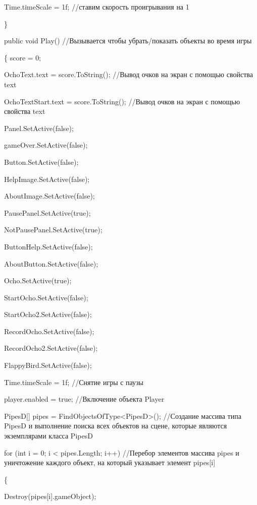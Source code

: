 \documentclass[14pt, oneside]{altsu-report}
\begin{document}
        Time.timeScale = 1f; //ставим скорость проигрывания на 1 
        
    \}
    

    public void Play() //Вызывается чтобы убрать/показать объекты во время игры 
    
    \{
        score = 0;

        OchoText.text = score.ToString(); //Вывод очков на экран с помощью свойства text

        OchoTextStart.text = score.ToString(); //Вывод очков на экран с помощью свойства text

        Panel.SetActive(false);
        
        gameOver.SetActive(false);
        
        Button.SetActive(false);
        
        HelpImage.SetActive(false);
        
        AboutImage.SetActive(false);
        
        PausePanel.SetActive(true);
        
        NotPausePanel.SetActive(true);
        
        ButtonHelp.SetActive(false);
        
        AboutButton.SetActive(false);
        
        Ocho.SetActive(true);
        
        StartOcho.SetActive(false);
        
        StartOcho2.SetActive(false);
        
        RecordOcho.SetActive(false);
        
        RecordOcho2.SetActive(false);
        
        FlappyBird.SetActive(false);

        Time.timeScale = 1f; //Снятие игры с паузы
        
        player.enabled = true; //Включение объекта Player

        PipesD[] pipes = FindObjectsOfType<PipesD>(); //Создание массива типа PipesD и выполнение поиска всех объектов на сцене, которые являются экземплярами класса PipesD 

        for (int i = 0; i < pipes.Length; i++) //Перебор элементов массива pipes и уничтожение каждого объект, на который указывает элемент pipes[i]
        
        \{
        
            
            Destroy(pipes[i].gameObject);
        
\end{document}
